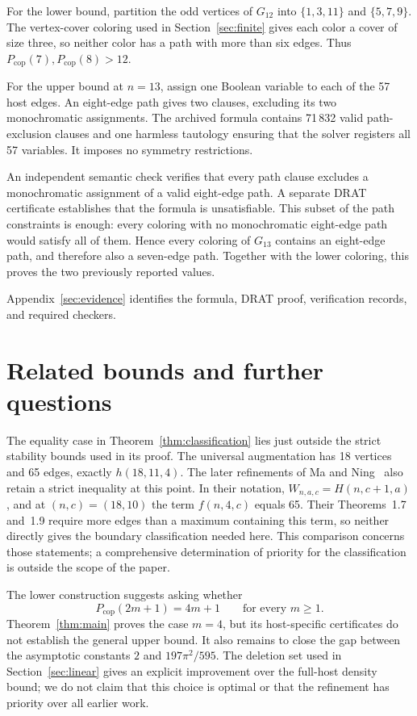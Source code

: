 \documentclass[12pt]{article}
\newcommand{\Pcop}{P_{\mathrm{cop}}}
\begin{document}
For the lower bound, partition the odd vertices of $G_{12}$
into $\{1,3,11\}$ and $\{5,7,9\}$. The vertex-cover coloring
used in Section~\ref{sec:finite} gives each color a cover of
size three, so neither color has a path with more than six
edges. Thus $\Pcop(7),\Pcop(8)>12$.

For the upper bound at $n=13$, assign one Boolean variable
to each of the 57 host edges. An eight-edge path gives two
clauses, excluding its two monochromatic assignments.
The archived formula contains 71\,832 valid path-exclusion
clauses and one harmless tautology ensuring that the solver
registers all 57 variables. It imposes no symmetry restrictions.

An independent semantic check verifies that every path clause
excludes a monochromatic assignment of a valid eight-edge path.
A separate DRAT certificate establishes that the formula is
unsatisfiable. This subset of the path constraints is enough:
every coloring with no monochromatic eight-edge path would
satisfy all of them. Hence every coloring of $G_{13}$ contains
an eight-edge path, and therefore also a seven-edge path.
Together with the lower coloring, this proves the two
previously reported values.

Appendix~\ref{sec:evidence} identifies the formula, DRAT proof,
verification records, and required checkers.

\section{Related bounds and further questions}\label{sec:context}

The equality case in Theorem~\ref{thm:classification} lies
just outside the strict stability bounds used in its proof.
The universal augmentation has 18 vertices and 65 edges,
exactly $h(18,11,4)$.
The later refinements of Ma and Ning~\cite{ma-ning} also
retain a strict inequality at this point.
In their notation, $W_{n,a,c}=H(n,c+1,a)$, and at
$(n,c)=(18,10)$ the term $f(n,4,c)$ equals 65.
Their Theorems~1.7 and~1.9 require more edges than a maximum
containing this term, so neither directly gives the boundary
classification needed here. This comparison concerns those
statements; a comprehensive determination of priority for
the classification is outside the scope of the paper.

The lower construction suggests asking whether
\[
 \Pcop(2m+1)=4m+1\qquad\text{for every }m\geq1.
\]
Theorem~\ref{thm:main} proves the case $m=4$, but its
host-specific certificates do not establish the general
upper bound. It also remains to close the gap between the
asymptotic constants $2$ and $197\pi^2/595$. The deletion
set used in Section~\ref{sec:linear} gives an explicit
improvement over the full-host density bound; we do not
claim that this choice is optimal or that the refinement
has priority over all earlier work.
\end{document}
